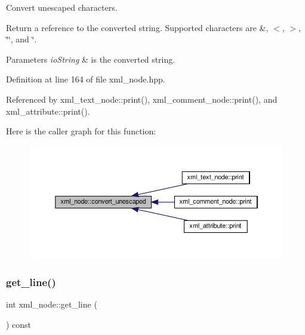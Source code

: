 Convert unescaped characters. 

Return a reference to the converted string. Supported characters are \textquotesingle{}\&\textquotesingle{}, \textquotesingle{}$<$\textquotesingle{}, \textquotesingle{}$>$\textquotesingle{}, \char`\"{}\textquotesingle{}\char`\"{}, and \textquotesingle{}\char`\"{}\textquotesingle{}. 
\begin{DoxyParams}{Parameters}
{\em io\+String} & is the converted string. \\
\hline
\end{DoxyParams}


Definition at line 164 of file xml\+\_\+node.\+hpp.



Referenced by xml\+\_\+text\+\_\+node\+::print(), xml\+\_\+comment\+\_\+node\+::print(), and xml\+\_\+attribute\+::print().

Here is the caller graph for this function\+:
\nopagebreak
\begin{figure}[H]
\begin{center}
\leavevmode
\includegraphics[width=350pt]{d1/dc3/classxml__node_a188abaf74feec1ee07866b84ce7d9550_icgraph}
\end{center}
\end{figure}
\mbox{\label{classxml__node_afc1ae2a83ce4949d511fdaef96d0e4f7}} 
\subsubsection{\texorpdfstring{get\+\_\+line()}{get\_line()}}
{\footnotesize\ttfamily int xml\+\_\+node\+::get\+\_\+line (\begin{DoxyParamCaption}{ }\end{DoxyParamCaption}) const}



